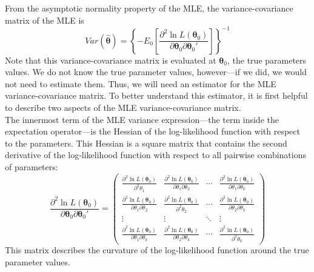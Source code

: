 \documentclass[11pt,letterpaper]{article}
\begin{document}
From the asymptotic normality property of the MLE, the variance-covariance matrix of the MLE is
$$Var(\widehat{\bm{\theta}}) = \left\{ -E_0 \left[ \frac{\partial^2 \ln L(\bm{\theta}_0)}{\partial \bm{\theta}_0 \partial \bm{\theta}_0'} \right] \right\}^{-1}$$
Note that this variance-covariance matrix is evaluated at $\bm{\theta}_0$, the true parameters values. We do not know the true parameter values, however---if we did, we would not need to estimate them. Thus, we will need an estimator for the MLE variance-covariance matrix. To better understand this estimator, it is first helpful to describe two aspects of the MLE variance-covariance matrix. \\

\noindent The innermost term of the MLE variance expression---the term inside the expectation operator---is the Hessian of the log-likelihood function with respect to the parameters. This Hessian is a square matrix that contains the second derivative of the log-likelihood function with respect to all pairwise combinations of parameters:
$$\frac{\partial^2 \ln L(\bm{\theta}_0)}{\partial \bm{\theta}_0 \partial \bm{\theta}_0'} = \begin{pmatrix}
  \frac{\partial^2 \ln L(\bm{\theta}_0)}{\partial^2 \theta_1} & \frac{\partial^2 \ln L(\bm{\theta}_0)}{\partial \theta_1 \partial \theta_2} & \cdots & \frac{\partial^2 \ln L(\bm{\theta}_0)}{\partial \theta_1 \partial \theta_k} \\
  \frac{\partial^2 \ln L(\bm{\theta}_0)}{\partial \theta_1 \partial \theta_2} & \frac{\partial^2 \ln L(\bm{\theta}_0)}{\partial^2 \theta_2} & \cdots & \frac{\partial^2 \ln L(\bm{\theta}_0)}{\partial \theta_2 \partial \theta_k} \\
  \vdots & \vdots & \ddots & \vdots \\
  \frac{\partial^2 \ln L(\bm{\theta}_0)}{\partial \theta_1 \partial \theta_k} & \frac{\partial^2 \ln L(\bm{\theta}_0)}{\partial \theta_2 \partial \theta_k} & \cdots & \frac{\partial^2 \ln L(\bm{\theta}_0)}{\partial^2 \theta_k}
\end{pmatrix}$$
This matrix describes the curvature of the log-likelihood function around the true parameter values. \\
\end{document}
